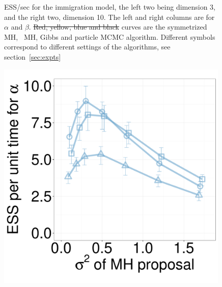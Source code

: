 \begin{figure}[H]
\begin{minipage}[hp]{0.24\linewidth}
	\end{minipage}
    \caption{ESS/sec for the immigration model, the left two being dimension 3, and the right two, dimension 10. The left and right columns are for $\alpha$ and $\beta$. \sout{Red, yellow, blue and black}  curves are the symmetrized MH, \naive\ MH, Gibbs and particle MCMC algorithm. Different symbols correspond to different settings of the algorithms, see section~\ref{sec:expts}}
     \label{fig:ESS_Q_D10}
  \end{figure}

  \begin{figure}[H]
  \centering
  \begin{minipage}[!hp]{0.24\linewidth}
  \centering
    \includegraphics [width=0.99\textwidth, angle=0]{figs/new_whole_exp_figs/mh_q_alpha_dim3.pdf}
\end{minipage}
  \begin{minipage}[hp]{0.24\linewidth}
  \centering

\end{minipage}
\end{figure}
